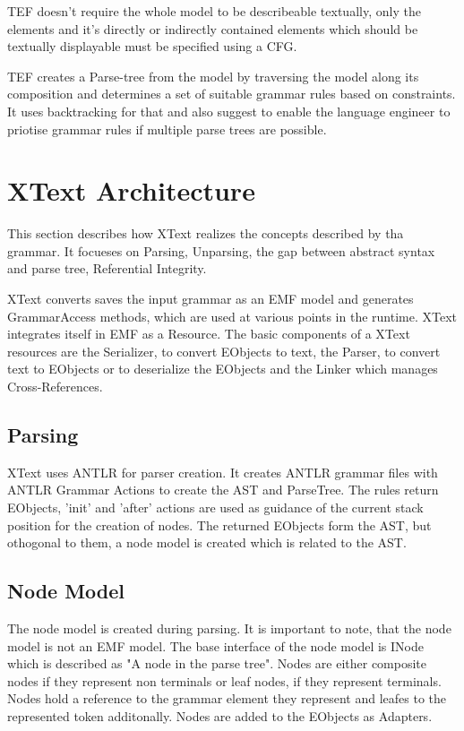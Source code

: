 TEF doesn't require the whole model to be describeable textually, only the elements and it's directly or indirectly contained elements which should be textually displayable must be specified using a CFG.

TEF creates a Parse-tree from the model by traversing the model along its composition and determines a set of suitable grammar rules based on constraints. It uses backtracking for that and \cite{TefPaper} also suggest to enable the language engineer to priotise grammar rules if multiple parse trees are possible.

\chapter{XText Architecture}
\label{cha:xtextarch}
This section describes how XText realizes the concepts described by tha grammar. It focueses on Parsing, Unparsing, the gap between abstract syntax and parse tree, Referential Integrity. 

XText converts saves the input grammar as an EMF model and generates GrammarAccess methods, which are used at various points in the runtime. XText integrates itself in EMF as a Resource.  The basic components of a XText resources are the Serializer, to convert EObjects to text, the Parser, to convert text to EObjects or to deserialize the EObjects and the Linker which manages Cross-References. 
\section{Parsing}
XText uses ANTLR\cite{ANTLR} for parser creation. It creates ANTLR grammar files with ANTLR Grammar Actions to create the AST and ParseTree. The rules return EObjects, 'init' and 'after' actions are used as guidance of the current stack position for the creation of nodes. The returned EObjects form the AST, but othogonal to them, a node model is created which is related to the AST. 

\section{Node Model}
The node model is created during parsing. It is important to note, that the node model is not an EMF model. The base interface of the node model is INode which  is described as "A node in the parse tree"\cite{XTextAPI}. Nodes are either composite nodes if they represent non terminals or leaf nodes, if they represent terminals. Nodes hold a reference to the grammar element they represent and leafes to the represented token additonally. Nodes are added to the EObjects as Adapters.

